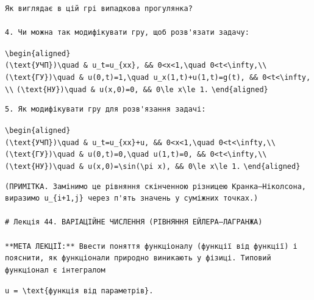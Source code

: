 \documentclass[
  ukrainian,
]{article}
\begin{document}
\begin{verbatim}
Як виглядає в цій грі випадкова прогулянка?

4. Чи можна так модифікувати гру, щоб розв'язати задачу:
\end{verbatim}

\texttt{\textbackslash{}begin\{aligned\}}
\texttt{(\textbackslash{}text\{УЧП\})\textbackslash{}quad\ \&\ u\_t=u\_\{xx\},\ \&\&\ 0\textless{}x\textless{}1,\textbackslash{}quad\ 0\textless{}t\textless{}\textbackslash{}infty,\textbackslash{}\textbackslash{}}
\texttt{(\textbackslash{}text\{ГУ\})\textbackslash{}quad\ \&\ u(0,t)=1,\textbackslash{}quad\ u\_x(1,t)+u(1,t)=g(t),\ \&\&\ 0\textless{}t\textless{}\textbackslash{}infty,\textbackslash{}\textbackslash{}}
\texttt{(\textbackslash{}text\{НУ\})\textbackslash{}quad\ \&\ u(x,0)=0,\ \&\&\ 0\textbackslash{}le\ x\textbackslash{}le\ 1.}
\texttt{\textbackslash{}end\{aligned\}}

\begin{verbatim}
5. Як модифікувати гру для розв'язання задачі:
\end{verbatim}

\texttt{\textbackslash{}begin\{aligned\}}
\texttt{(\textbackslash{}text\{УЧП\})\textbackslash{}quad\ \&\ u\_t=u\_\{xx\}+u,\ \&\&\ 0\textless{}x\textless{}1,\textbackslash{}quad\ 0\textless{}t\textless{}\textbackslash{}infty,\textbackslash{}\textbackslash{}}
\texttt{(\textbackslash{}text\{ГУ\})\textbackslash{}quad\ \&\ u(0,t)=0,\textbackslash{}quad\ u(1,t)=0,\ \&\&\ 0\textless{}t\textless{}\textbackslash{}infty,\textbackslash{}\textbackslash{}}
\texttt{(\textbackslash{}text\{НУ\})\textbackslash{}quad\ \&\ u(x,0)=\textbackslash{}sin(\textbackslash{}pi\ x),\ \&\&\ 0\textbackslash{}le\ x\textbackslash{}le\ 1.}
\texttt{\textbackslash{}end\{aligned\}}

\begin{verbatim}
(ПРИМІТКА. Замінимо це рівняння скінченною різницею Кранка–Ніколсона, виразимо u_{i+1,j} через п'ять значень у суміжних точках.)

# Лекція 44. ВАРІАЦІЙНЕ ЧИСЛЕННЯ (РІВНЯННЯ ЕЙЛЕРА–ЛАГРАНЖА)

**МЕТА ЛЕКЦІЇ:** Ввести поняття функціоналу (функції від функції) і пояснити, як функціонали природно виникають у фізиці. Типовий функціонал є інтегралом
\end{verbatim}

\texttt{u\ =\ \textbackslash{}text\{функція\ від\ параметрів\}.}
\end{document}
